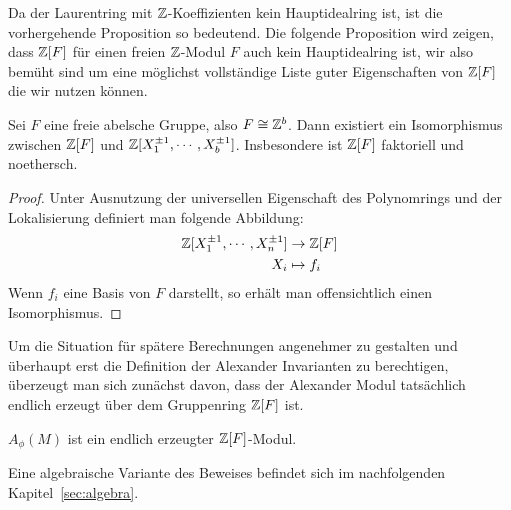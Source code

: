 Da der Laurentring mit $\mathbb{Z}$-Koeffizienten kein Hauptidealring ist, ist die vorhergehende Proposition so bedeutend. Die folgende Proposition wird zeigen, dass $\mathbb{Z}[F]$ für einen freien $\mathbb{Z}$-Modul $F$ auch kein Hauptidealring ist, wir also bemüht sind um eine möglichst vollständige Liste guter Eigenschaften von $\mathbb{Z}[F]$ die wir nutzen können.

\begin{prop}
\label{prop:gruppenringnoethersch}
	Sei $F$ eine freie abelsche Gruppe, also $F\cong \mathbb{Z}^b$. Dann existiert ein Isomorphismus zwischen $\mathbb{Z}[F]$ und $\mathbb{Z}[X_1^{\pm 1},\cdots,X_{b}^{\pm 1}] $. Insbesondere ist $\mathbb{Z}[F]$ faktoriell und noethersch.
\end{prop}
\begin{proof}
	Unter Ausnutzung der universellen Eigenschaft des Polynomrings und der Lokalisierung definiert man folgende Abbildung:
	\begin{align*}
			\mathbb{Z}[X_1^{\pm 1},\cdots,X_{n}^{\pm 1}] & \to  \mathbb{Z}[F]\\
			X_i &\mapsto  f_i
	\end{align*}
	Wenn $f_i$ eine Basis von $F$ darstellt, so erhält man offensichtlich einen Isomorphismus.
\end{proof}




Um die Situation für spätere Berechnungen angenehmer zu gestalten und überhaupt erst die Definition der Alexander Invarianten zu berechtigen, überzeugt man sich zunächst davon, dass der Alexander Modul tatsächlich endlich erzeugt über dem Gruppenring $\mathbb{Z}[F]$ ist. 

\begin{prop}
\label{prop:alexendlerz}
		$A_\phi(M)$ ist ein endlich erzeugter $\mathbb{Z}[F]$-Modul.
\end{prop}
\begin{bem}\label{rem:AlexModulendlerz}
	Eine algebraische Variante des Beweises befindet sich im nachfolgenden Kapitel~\ref{sec:algebra}. 
\end{bem}


